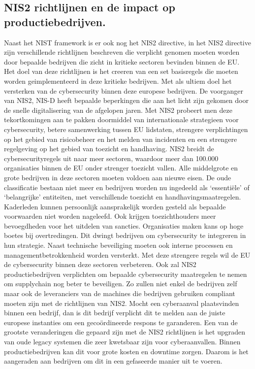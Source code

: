 \subsection{NIS2 richtlijnen en de impact op productiebedrijven.}
Naast het NIST framework is er ook nog het NIS2 directive, in het NIS2 directive zijn verschillende richtlijnen beschreven die verplicht genomen moeten worden door bepaalde bedrijven die zicht in kritieke sectoren bevinden binnen de EU. Het doel van deze richtlijnen is het creeren van een set basisregels die moeten worden geimplementeerd in deze kritieke bedrijven. Met als ultiem doel het versterken van de cybersecurity binnen deze europese bedrijven. \autocite{VanLeeuwen2025}
De voorganger van NIS2, NIS-D heeft bepaalde beperkingen die aan het licht zijn gekomen door de snelle digitalisering van de afgelopen jaren. Met NIS2 probeert men deze tekortkomingen aan te pakken doormiddel van internationale strategieen voor cybersecurity, betere samenwerking tussen EU lidstaten, strengere verplichtingen op het gebied van risicobeheer en het melden van incidenten en een strengere regelgeving op het gebied van toezicht en handhaving. \autocite{Ey2025}
NIS2 breidt de cybersecurityregels uit naar meer sectoren, waardoor meer dan 100.000 organisaties binnen de EU onder strenger toezicht vallen. Alle middelgrote en grote bedrijven in deze sectoren moeten voldoen aan nieuwe eisen. De oude classificatie bestaan niet meer en bedrijven worden nu ingedeeld als ‘essentiële’ of ‘belangrijke’ entiteiten, met verschillende toezicht en handhavingsmaatregelen. Kaderleden kunnen persoonlijk aansprakelijk worden gesteld als bepaalde voorwaarden niet worden nageleefd. Ook krijgen toezichthouders meer bevoegdheden voor het uitdelen van sancties. Organisaties maken kans op hoge boetes bij overtredingen. Dit dwingt bedrijven om cybersecurity te integreren in hun strategie. Naast technische beveiliging moeten ook interne processen en managementbetrokkenheid worden versterkt. Met deze strengere regels wil de EU de cybersecurity binnen deze sectoren verbeteren. \autocite{Ey2025}
Ook zal NIS2 productiebedrijven verplichten om bepaalde cybersecurity maatregelen te nemen om supplychain nog beter te beveiligen. Zo zullen niet enkel de bedrijven zelf maar ook de leveranciers van de machines die bedrijven gebruiken compliant moeten zijn met de richtlijnen van NIS2. Mocht een cyberaanval plaatsvinden binnen een bedrijf, dan is dit bedrijf verplicht dit te melden aan de juiste europese instanties om een gecoördineerde respons te garanderen. Een van de grootste veranderingen die gepaard zijn met de NIS2 richtlijnen is het upgraden van oude legacy systemen die zeer kwetsbaar zijn voor cyberaanvallen. Binnen productiebedrijven kan dit voor grote kosten en downtime zorgen. Daarom is het aangeraden aan bedrijven om dit in een gefaseerde manier uit te voeren. \autocite{Lansweeper2024}


